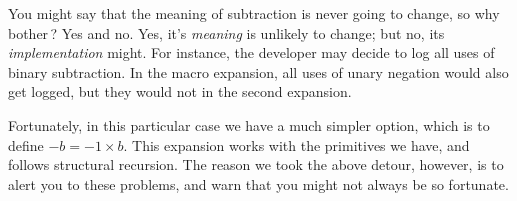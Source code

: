 \begin{enumerate}
You might say that the meaning of subtraction is never going to change, so why
bother\,?
Yes and no.
Yes, it’s \emph{meaning} is unlikely to change;
but no, its \emph{implementation} might.
For instance, the developer may decide to log all uses of binary subtraction.
In the macro expansion, all uses of unary negation would also get logged, but
they would not in the second expansion.

\end{enumerate}

Fortunately, in this particular case we have a much simpler option, which is to
define
$-b=-1\times b$.
This expansion works with the primitives we have, and follows structural
recursion.
The reason we took the above detour, however, is to alert you to these problems,
and warn that you might not always be so fortunate.
